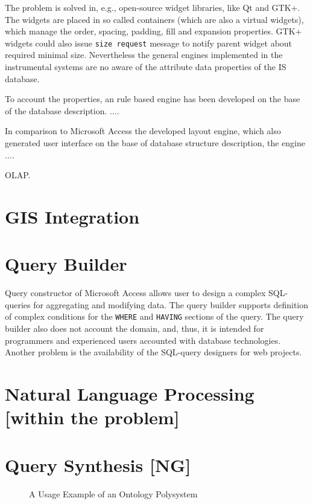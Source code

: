 \documentclass[conference]{IEEEtran}
\begin{document}
The problem is solved in, e.g., open-source widget libraries, like Qt and GTK+.  The widgets are placed in so called containers (which are also a virtual widgets), which manage the order, spacing, padding, fill and expansion properties.  GTK+ widgets could also issue \texttt{size request} message to notify parent widget about required minimal size.  Nevertheless the general engines implemented in the instrumental systems are no aware of the attribute data properties of the IS database.

To account the properties, an rule based engine has been developed on the base of the database description.  ....


In comparison to Microsoft Access the developed layout engine, which also generated user interface on the base of database structure description, the engine ....

OLAP.

\section{GIS Integration}
\label{sec:gis-integration}



\section{Query Builder}
\label{sec:query-builder}


Query constructor of Microsoft Access allows user to design a complex SQL-queries for aggregating and modifying data.  The query builder supports definition of complex conditions for the \texttt{WHERE} and \texttt{HAVING} sections of the query.  The query builder also does not account the domain, and, thus, it is intended for programmers and experienced users accounted with database technologies.  Another problem is the availability of the SQL-query designers for web projects.


\section{Natural Language Processing [within the problem]}
\label{sec:natur-lang-proc}

\section{Query Synthesis [NG]}
\label{sec:query-synthesis-ng}


\begin{figure}
\centering\footnotesize\sf
\def\svgwidth{0.9\linewidth}

\caption{A Usage Example of an Ontology Polysystem}
\label{OPSA}
\end{figure}
\end{document}
